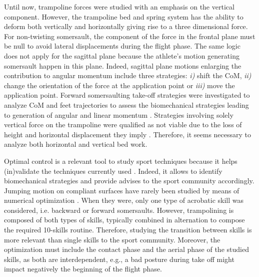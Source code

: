 Until now, trampoline forces were studied with an emphasis on the vertical component.
However, the trampoline bed and spring system has the ability to deform both vertically and horizontally giving rise to a three dimensional force.
For non-twisting somersault, the component of the force in the frontal plane must be null to avoid lateral displacements during the flight phase.
The same logic does not apply for the sagittal plane because the athlete's motion 
generating somersault happen in this plane.
Indeed, sagittal plane motions enlarging the contribution to angular momentum include three strategies: \textit{i)} shift the CoM, \textit{ii)} change the orientation of the force at the application point or \textit{iii)} move the application point.
Forward somersaulting take-off strategies were investigated to analyze CoM and feet trajectories to assess the biomechanical strategies leading to generation of angular and linear momentum \cite{lephartatiner}.
Strategies involving solely vertical force on the trampoline were qualified as not viable due to the loss of height and horizontal displacement they imply \cite{lephartatiner}.
Therefore, it seems necessary to analyze both horizontal and vertical bed work.


Optimal control is a relevant tool to study sport techniques because it helps (in)validate the techniques currently used \cite{charbonneau2020optimal}.
Indeed, it allows to identify biomechanical strategies and provide advises to the sport community accordingly.
Jumping motion on compliant surfaces have rarely been studied by means of numerical optimization \cite{cheng2008role, burke2015mechanics}.
When they were, only one type of acrobatic skill was considered, i.e. backward or forward somersaults.
However, trampolining is composed of both types of skills, typically combined in alternation to compose the required 10-skills routine. 
Therefore, studying the transition between skills is more relevant than single skills to the sport community.
Moreover, the optimization must include the contact phase and the aerial phase of the studied skills, as both are interdependent, e.g., a bad posture during take off might impact negatively the beginning of the flight phase. 


